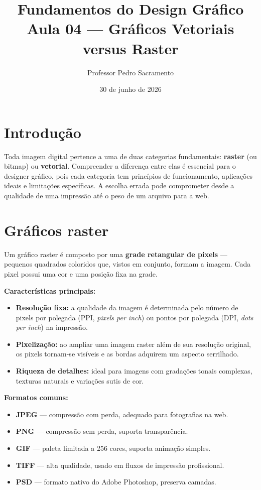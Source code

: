 \documentclass[a4paper,12pt]{article}
\title{\textbf{Fundamentos do Design Gráfico}\\[4pt]\large Aula 04 --- Gráficos Vetoriais versus Raster}
\author{Professor Pedro Sacramento}
\date{30 de junho de 2026}
\begin{document}
\maketitle

\section{Introdução}

Toda imagem digital pertence a uma de duas categorias fundamentais: \textbf{raster} (ou bitmap) ou \textbf{vetorial}. Compreender a diferença entre elas é essencial para o designer gráfico, pois cada categoria tem princípios de funcionamento, aplicações ideais e limitações específicas. A escolha errada pode comprometer desde a qualidade de uma impressão até o peso de um arquivo para a web.

\section{Gráficos raster}

Um gráfico raster é composto por uma \textbf{grade retangular de pixels} --- pequenos quadrados coloridos que, vistos em conjunto, formam a imagem. Cada pixel possui uma cor e uma posição fixa na grade.

\bigskip
\noindent \textbf{Características principais:}

\begin{itemize}[nosep]
  \item \textbf{Resolução fixa:} a qualidade da imagem é determinada pelo número de pixels por polegada (PPI, \textit{pixels per inch}) ou pontos por polegada (DPI, \textit{dots per inch}) na impressão.
  \item \textbf{Pixelização:} ao ampliar uma imagem raster além de sua resolução original, os pixels tornam-se visíveis e as bordas adquirem um aspecto serrilhado.
  \item \textbf{Riqueza de detalhes:} ideal para imagens com gradações tonais complexas, texturas naturais e variações sutis de cor.
\end{itemize}

\medskip
\noindent \textbf{Formatos comuns:}

\begin{itemize}[nosep]
  \item \textbf{JPEG} --- compressão com perda, adequado para fotografias na web.
  \item \textbf{PNG} --- compressão sem perda, suporta transparência.
  \item \textbf{GIF} --- paleta limitada a 256 cores, suporta animação simples.
  \item \textbf{TIFF} --- alta qualidade, usado em fluxos de impressão profissional.
  \item \textbf{PSD} --- formato nativo do Adobe Photoshop, preserva camadas.
\end{itemize}
\end{document}
